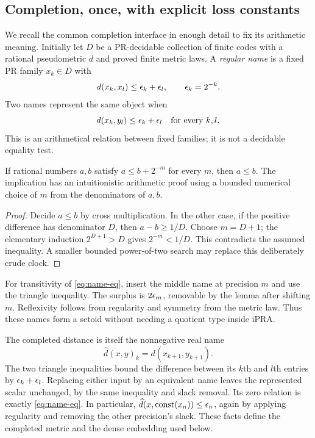 \subsection{Completion, once, with explicit loss constants}\label{sec:completion}

We recall the common completion interface in enough detail to fix its arithmetic meaning. Initially let $D$ be a PR-decidable collection of finite codes with a rational pseudometric $d$ and proved finite metric laws. A \emph{regular name} is a fixed PR family $x_k\in D$ with
\begin{equation}\label{eq:regular}
 d(x_k,x_l)\le\epsilon_k+\epsilon_l,\qquad \epsilon_k=2^{-k}.
\end{equation}
Two names represent the same object when
\begin{equation}\label{eq:name-eq}
 d(x_k,y_l)\le\epsilon_k+\epsilon_l\quad\hbox{for every }k,l.
\end{equation}
This is an arithmetical relation between fixed families; it is not a decidable equality test.

\begin{lemma}\label{lem:slack}
If rational numbers $a,b$ satisfy $a\le b+2^{-m}$ for every $m$, then $a\le b$. The implication has an intuitionistic arithmetic proof using a bounded numerical choice of $m$ from the denominators of $a,b$.
\end{lemma}
\begin{proof}
Decide $a\le b$ by cross multiplication. In the other case, if the positive difference has denominator $D$, then $a-b\ge1/D$. Choose $m=D+1$; the elementary induction $2^{D+1}>D$ gives $2^{-m}<1/D$. This contradicts the assumed inequality. A smaller bounded power-of-two search may replace this deliberately crude clock.
\end{proof}
For transitivity of \eqref{eq:name-eq}, insert the middle name at precision $m$ and use the triangle inequality. The surplus is $2\epsilon_m$, removable by the lemma after shifting $m$. Reflexivity follows from regularity and symmetry from the metric law. Thus these names form a setoid without needing a quotient type inside iPRA.

The completed distance is itself the nonnegative real name
\[
 \widehat d(x,y)_k=d(x_{k+1},y_{k+1}).
\]
The two triangle inequalities bound the difference between its $k$th and $l$th entries by $\epsilon_k+\epsilon_l$. Replacing either input by an equivalent name leaves the represented scalar unchanged, by the same inequality and slack removal. Its zero relation is exactly \eqref{eq:name-eq}. In particular, $\widehat d(x,\operatorname{const}(x_n))\le\epsilon_n$, again by applying regularity and removing the other precision's slack. These facts define the completed metric and the dense embedding used below.

